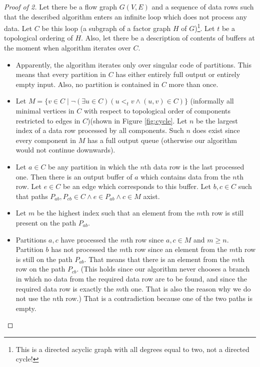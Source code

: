 \begin{proof}[Proof of 2] Let there be a flow graph $G(V,E)$ and a sequence of data rows such that the described algorithm enters an infinite loop which does not process any data. Let $C$ be this loop (a subgraph of a factor graph $H$ of $G$)\footnote{This is a directed acyclic graph with all degrees equal to two, not a directed cycle!}. Let $t$ be a topological ordering of $H$. Also, let there be a description of  contents of buffers at the moment when algorithm iterates over $C$.
  \begin{itemize}
    \item Apparently, the algorithm iterates only over singular code of partitions. This means that every partition in $C$ has either entirely full output or entirely empty input. Also, no partition is contained in $C$ more than once.
    \item Let $M = \{v \in C \mid \neg (\exists u \in C)( u <_t v \land (u,v) \in C )\}$ (informally all minimal vertices in $C$ with respect to topological order of components restricted to edges in $C$)(shown in Figure \ref{fig:cycle}. Let $n$ be the largest index of a data row processed by all components. Such $n$ does exist since every component in $M$ has a full output queue (otherwise our algorithm would not continue downwards).

    \item Let $a \in C$ be any partition in which the $n$th data row is the last processed one. Then there is an output buffer of $a$ which contains data from the $n$th row. Let $e \in C$ be an edge which corresponds to this buffer.  Let $b,c \in C$ such that paths $P_{ab}, P_{cb} \in C \land e \in P_{ab} \land c \in M$ axist. 

    \item Let $m$ be the highest index such that an element from the $m$th row is still present on the path $P_{ab}$. 

    \item Partitions $a,c$ have processed the $m$th row since $a,c \in M$ and $m \geq n$. Partition $b$ has not processed the $m$th row since an element from the $m$th row is still on the path $P_{ab}$. That means that there is an element from the $m$th row on the path $P_{cb}$. (This holds since our algorithm never chooses a branch in which no data from the required data row are to be found, and since the required data row is exactly the $m$th one. That is also the reason why we do not use the $n$th row.) That is a contradiction because one of the two paths is empty.

  \end{itemize}

\end{proof}
